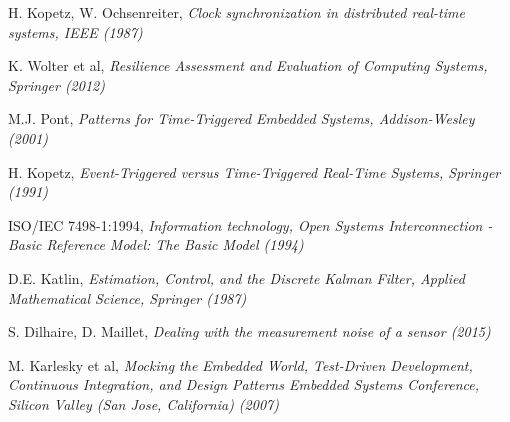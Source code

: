 \begin{thebibliography}{9}
H. Kopetz, W. Ochsenreiter, \textit{Clock synchronization in distributed real-time systems, IEEE (1987)}

K. Wolter et al,
\textit{Resilience Assessment and Evaluation of Computing Systems, Springer (2012)}

M.J. Pont, \emph{Patterns for Time-Triggered Embedded Systems, Addison-Wesley (2001)}

H. Kopetz, \emph{Event-Triggered versus Time-Triggered Real-Time Systems, Springer (1991)}

ISO/IEC 7498-1:1994, \textit{
Information technology, Open Systems Interconnection - Basic Reference Model: The Basic Model (1994)}

D.E. Katlin, \textit{Estimation, Control, and the Discrete Kalman Filter, Applied Mathematical Science, Springer (1987)}

S. Dilhaire, D. Maillet, \textit{Dealing  with the measurement noise of a sensor (2015)}

M. Karlesky et al, \textit{Mocking the Embedded World,
Test-Driven Development, Continuous Integration, and Design Patterns
Embedded Systems Conference, Silicon Valley (San Jose, California)
(2007)}

\end{thebibliography}